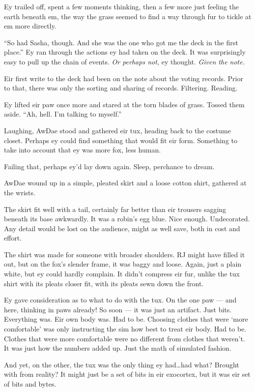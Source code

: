 Ey trailed off, spent a few moments thinking, then a few more just feeling the earth beneath em, the way the grass seemed to find a way through fur to tickle at em more directly.

``So had Sasha, though. And she was the one who got me the deck in the first place.'' Ey ran through the actions ey had taken on the deck. It was surprisingly easy to pull up the chain of events. \emph{Or perhaps not,} ey thought. \emph{Given the note.}

Eir first write to the deck had been on the note about the voting records. Prior to that, there was only the sorting and sharing of records. Filtering. Reading.

Ey lifted eir paw once more and stared at the torn blades of grass. Tossed them aside. ``Ah, hell. I'm talking to myself.''

Laughing, AwDae stood and gathered eir tux, heading back to the costume closet. Perhaps ey could find something that would fit eir form. Something to take into account that ey was more fox, less human.

Failing that, perhaps ey'd lay down again. Sleep, perchance to dream.

AwDae wound up in a simple, pleated skirt and a loose cotton shirt, gathered at the wrists.

The skirt fit well with a tail, certainly far better than eir trousers sagging beneath its base awkwardly. It was a robin's egg blue. Nice enough. Undecorated. Any detail would be lost on the audience, might as well save, both in cost and effort.

The shirt was made for someone with broader shoulders. RJ might have filled it out, but on the fox's slender frame, it was baggy and loose. Again, just a plain white, but ey could hardly complain. It didn't compress eir fur, unlike the tux shirt with its pleats closer fit, with its pleats sewn down the front.

Ey gave consideration as to what to do with the tux. On the one paw — and here, thinking in paws already! So soon — it was just an artifact. Just bits. Everything was. Eir own body was. Had to be. Choosing clothes that were `more comfortable' was only instructing the sim how best to treat eir body. Had to be. Clothes that were more comfortable were no different from clothes that weren't. It was just how the numbers added up. Just the math of simulated fashion.

And yet, on the other, the tux was the only thing ey had\ldots{}had what? Brought with from reality? It might just be a set of bits in eir exocortex, but it was eir set of bits and bytes.

